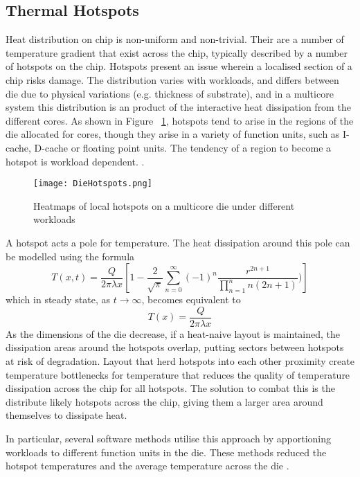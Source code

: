 		\subsection{Thermal Hotspots}
			Heat distribution on chip is non-uniform and non-trivial. Their are a number of temperature gradient that exist across the chip, typically described by a number of hotspots on the chip. Hotspots present an issue wherein a localised section of a chip risks damage. The distribution varies with workloads, and differs between die due to physical variations (e.g. thickness of substrate), and in a multicore system this distribution is an product of the interactive heat dissipation from the different cores. As shown in Figure ~\ref{fig:DieHotspots}, hotspots tend to arise in the regions of the die allocated for cores, though they arise in a variety of function units, such as I-cache, D-cache or floating point units. The tendency of a region to become a hotspot is workload dependent.  . 
			
			\begin{figure}[h]
				\centering
				\texttt{[image: DieHotspots.png]}
				\caption{Heatmaps of local hotspots on a multicore die under different workloads \cite*{HotspotsInDie}}
				\label{fig:DieHotspots}
			\end{figure}
		
			A hotspot acts a pole for temperature. The heat dissipation around this pole can be modelled using the formula 
			\begin{equation}
				T(x,t) = \frac{Q}{2 \pi \lambda x} \left[ 1-\frac{2}{\sqrt{\pi}} \sum_{n=0}^{\infty} (-1)^n \frac{r^{2n+1}}{\prod_{n=1}^{n}n(2n+1)}) \right]
			\end{equation}
			which in steady state, as $t \to \infty$, becomes equivalent to 
			\begin{equation}
				T(x) = \frac{Q}{2 \pi \lambda x}
			\end{equation}
			As the dimensions of the die decrease, if a heat-naive layout is maintained, the dissipation areas around the hotspots overlap, putting sectors between hotspots at risk of degradation. Layout that herd hotspots into each other proximity create temperature bottlenecks for temperature that reduces the quality of temperature dissipation across the chip for all hotspots. The solution to combat this is the distribute likely hotspots across the chip, giving them a larger area around themselves to dissipate heat.
			
			In particular, several software methods utilise this approach by apportioning workloads to different function units in the die. These methods reduced the hotspot temperatures and the average temperature across the die \cite*{HotspotsInDie}.


